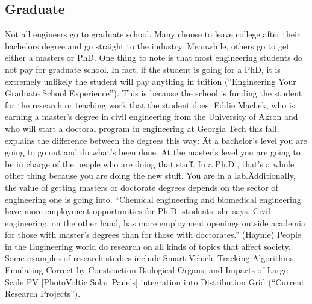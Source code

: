     \subsection{Graduate}
        Not all engineers go to graduate school. Many choose to leave college after their bachelors degree and go straight to the industry. Meanwhile, others go to get either a masters or PhD. One thing to note is that most engineering students do not pay for graduate school. In fact, if the student is going for a PhD, it is extremely unlikely the student will pay anything in tuition (“Engineering Your Graduate School Experience”). This is because the school is funding the student for the research or teaching work that the student does. Eddie Machek, who is earning a master's degree in civil engineering from the University of Akron and who will start a doctoral program in engineering at Georgia Tech this fall, explains the difference between the degrees this way: \"At a bachelor's level you are going to go out and do what's been done. At the master's level you are going to be in charge of the people who are doing that stuff. In a Ph.D., that's a whole other thing because you are doing the new stuff. You are in a lab.\" Additionally, the value of getting masters or doctorate degrees depends on the sector of engineering one is going into. “Chemical engineering and biomedical engineering have more employment opportunities for Ph.D. students, she says. Civil engineering, on the other hand, has more employment openings outside academia for those with master’s degrees than for those with doctorates.”  (Haynie) 
        People in the Engineering world do research on all kinds of topics that affect society. Some examples of research studies include Smart Vehicle Tracking Algorithms, Emulating Correct by Construction Biological Organs, and Impacts of Large-Scale PV [PhotoVoltic Solar Panels] integration into Distribution Grid (“Current Research Projects”). 
